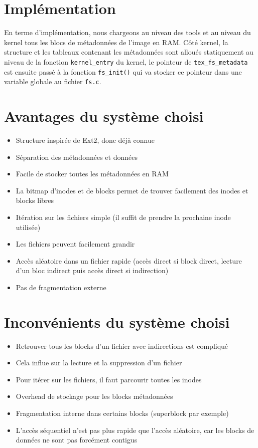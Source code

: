\documentclass{article}
\begin{document}
\section{Implémentation}
En terme d'implémentation, nous chargeons au niveau des tools et au niveau du kernel tous les blocs de métadonnées de l'image en RAM. Côté kernel, la structure et les tableaux contenant les métadonnées sont alloués statiquement au niveau de la fonction \verb+kernel_entry+ du kernel, le pointeur de \verb+tex_fs_metadata+ est ensuite passé à la fonction \verb+fs_init()+ qui va stocker ce pointeur dans une variable globale au fichier \verb+fs.c+.
\section{Avantages du système choisi}
\begin{itemize}
	\item Structure inspirée de Ext2, donc déjà connue
	\item Séparation des métadonnées et données
	\item Facile de stocker toutes les métadonnées en RAM
	\item La bitmap d'inodes et de blocks permet de trouver facilement des inodes et blocks libres
	\item Itération sur les fichiers simple (il suffit de prendre la prochaine inode utilisée)
	\item Les fichiers peuvent facilement grandir
	\item Accès aléatoire dans un fichier rapide (accès direct si block direct, lecture d'un bloc indirect puis accès direct si indirection)
	\item Pas de fragmentation externe
\end{itemize}
\section{Inconvénients du système choisi}
\begin{itemize}
	\item Retrouver tous les blocks d'un fichier avec indirections est compliqué
	\item Cela influe sur la lecture et la suppression d'un fichier
	\item Pour itérer sur les fichiers, il faut parcourir toutes les inodes
	\item Overhead de stockage pour les blocks métadonnées
	\item Fragmentation interne dans certains blocks (superblock par exemple)
	\item L'accès séquentiel n'est pas plus rapide que l'accès aléatoire, car les blocks de données ne sont pas forcément contigus
\end{itemize}
\end{document}
